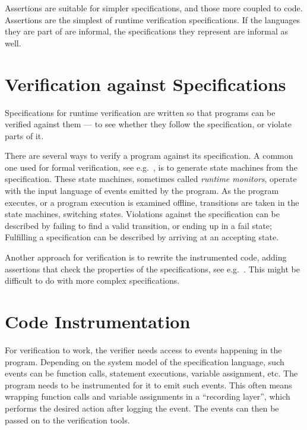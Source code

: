 Assertions are suitable for simpler specifications, and those more coupled to
code. Assertions are the simplest of runtime verification specifications. If
the languages they are part of are informal, the specifications they represent
are informal as well.



\section{Verification against Specifications} \label{section-verification}

Specifications for runtime verification are written so that programs can be
verified against them --- to see whether they follow the specification, or
violate parts of it.

There are several ways to verify a program against its specification. A common
one used for formal verification, see e.g.\ \cite{bauer06monitoring,
bodden05efficientrv, jalili07rverl, barringer03eagle}, is to generate state
machines from the specification. These state machines, sometimes called
\textit{runtime monitors}, operate with the input language of events emitted by
the program. As the program executes, or a program execution is examined
offline, transitions are taken in the state machines, switching states.
Violations against the specification can be described by failing to find a
valid transition, or ending up in a fail state; Fulfilling a specification can
be described by arriving at an accepting state.

Another approach for verification is to rewrite the instrumented code, adding
assertions that check the properties of the specifications, see e.g.\
\cite{rosenblum95practicalassertions, drusinsky00temporalrover}. This might be
difficult to do with more complex specifications.


\section{Code Instrumentation} \label{section-instrumentation}

For verification to work, the verifier needs access to events happening in the
program. Depending on the system model of the specification language, such
events can be function calls, statement executions, variable assignment, etc.
The program needs to be instrumented for it to emit such events. This often
means wrapping function calls and variable assignments in a ``recording
layer'', which performs the desired action after logging the event. The events
can then be passed on to the verification tools.

